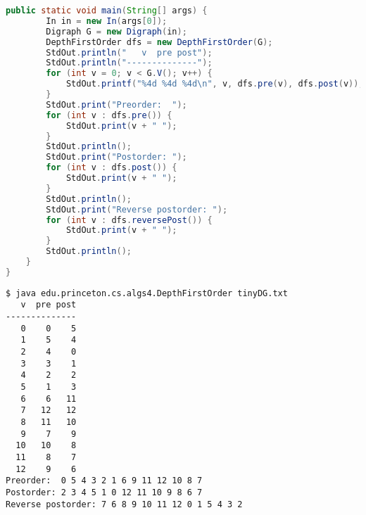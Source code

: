 \documentclass[8pt,a4paper,compress]{beamer}
\begin{document}
\begin{frame}[fragile]
\pause

\begin{lstlisting}[language=Java]
    public static void main(String[] args) {
        In in = new In(args[0]);
        Digraph G = new Digraph(in);
        DepthFirstOrder dfs = new DepthFirstOrder(G);
        StdOut.println("   v  pre post");
        StdOut.println("--------------");
        for (int v = 0; v < G.V(); v++) {
            StdOut.printf("%4d %4d %4d\n", v, dfs.pre(v), dfs.post(v));
        }
        StdOut.print("Preorder:  ");
        for (int v : dfs.pre()) {
            StdOut.print(v + " ");
        }
        StdOut.println();
        StdOut.print("Postorder: ");
        for (int v : dfs.post()) {
            StdOut.print(v + " ");
        }
        StdOut.println();
        StdOut.print("Reverse postorder: ");
        for (int v : dfs.reversePost()) {
            StdOut.print(v + " ");
        }
        StdOut.println();
    }
}
\end{lstlisting}
\end{frame}

\begin{frame}[fragile]
\pause

\begin{lstlisting}[language={}]
$ java edu.princeton.cs.algs4.DepthFirstOrder tinyDG.txt 
   v  pre post
--------------
   0    0    5
   1    5    4
   2    4    0
   3    3    1
   4    2    2
   5    1    3
   6    6   11
   7   12   12
   8   11   10
   9    7    9
  10   10    8
  11    8    7
  12    9    6
Preorder:  0 5 4 3 2 1 6 9 11 12 10 8 7 
Postorder: 2 3 4 5 1 0 12 11 10 9 8 6 7 
Reverse postorder: 7 6 8 9 10 11 12 0 1 5 4 3 2 
\end{lstlisting}
\end{frame}
\end{document}
